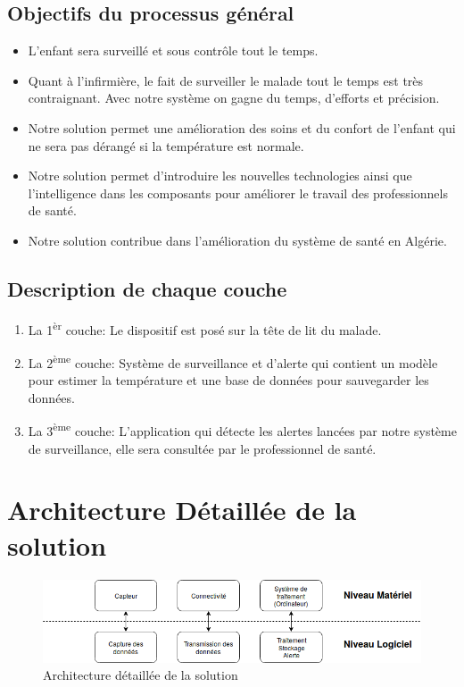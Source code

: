 \documentclass[12pt]{article}
\begin{document}
\subsection{Objectifs du processus général}
\begin{itemize}
	\item L’enfant sera surveillé et sous contrôle tout le temps.
	\item Quant à l'infirmière, le fait de surveiller le malade tout le temps est très contraignant. Avec notre système on gagne du temps, d'efforts et précision.	
	\item Notre solution permet une amélioration des soins et du confort de l'enfant qui ne sera pas dérangé si la température est normale.
		\item Notre solution permet d'introduire les nouvelles technologies ainsi que l'intelligence dans les composants pour améliorer le travail des professionnels de santé.
	\item Notre solution contribue dans l'amélioration du système de santé en Algérie.
\end{itemize}

\subsection{Description de chaque couche}
\begin{enumerate}
		\item La 1\textsuperscript{èr} couche: Le dispositif est posé sur la tête de lit du malade. 
		\item La 2\textsuperscript{ème} couche: Système de surveillance et d'alerte qui contient  un modèle pour estimer la température et une base de données pour sauvegarder les données.
		\item La 3\textsuperscript{ème} couche: L'application qui détecte les alertes lancées par notre système de surveillance, elle sera consultée par le professionnel de santé.
\end{enumerate}

\section{Architecture Détaillée de la solution}

\begin{figure}[h]
	\centering
	\includegraphics[width=14cm]{img-Chapiter-3/architecturedetaillee.png}
	\caption{Architecture détaillée de la solution}
\end{figure}
\end{document}
